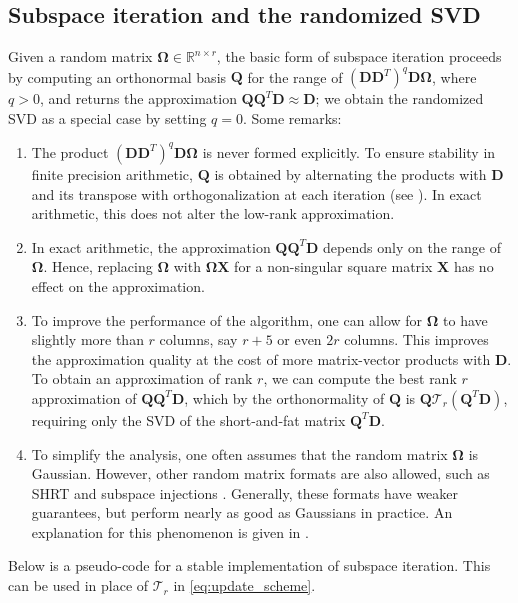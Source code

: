 \documentclass[11pt]{article}
\begin{document}
\subsection{Subspace iteration and the randomized SVD}\label{section:subspaceiteration}
Given a random matrix $\bm{\Omega} \in \mathbb{R}^{n \times r}$, the basic form of subspace iteration proceeds by computing an orthonormal basis $\bm{Q}$ for the range of $(\bm{D}\bm{D}^T)^q \bm{D} \bm{\Omega}$, where $q > 0$, and returns the approximation $\bm{Q} \bm{Q}^T \bm{D} \approx \bm{D}$; we obtain the randomized SVD as a special case by setting $q = 0$. Some remarks:
\begin{enumerate}
    \item[i)] The product $(\bm{D}\bm{D}^T)^q \bm{D} \bm{\Omega}$ is never formed explicitly. To ensure stability in finite precision arithmetic, $\bm{Q}$ is obtained by alternating the products with $\bm{D}$ and its transpose with orthogonalization at each iteration (see ). In exact arithmetic, this does not alter the low-rank approximation.
    \item[ii)] In exact arithmetic, the approximation $\bm{Q} \bm{Q}^T \bm{D}$ depends only on the range of $\bm{\Omega}$. Hence, replacing $\bm{\Omega}$ with $\bm{\Omega} \bm{X}$ for a non-singular square matrix $\bm{X}$ has no effect on the approximation. 
    \item[iii)] To improve the performance of the algorithm, one can allow for $\bm{\Omega}$ to have slightly more than $r$ columns, say $r+5$ or even $2r$ columns. This improves the approximation quality at the cost of more matrix-vector products with $\bm{D}$. To obtain an approximation of rank $r$, we can compute the best rank $r$ approximation of $\bm{Q} \bm{Q}^T \bm{D}$, which by the orthonormality of $\bm{Q}$ is $\bm{Q} \mathcal{T}_r(\bm{Q}^T \bm{D})$, requiring only the SVD of the short-and-fat matrix $\bm{Q}^T \bm{D}$. 
    \item[iv)] To simplify the analysis, one often assumes that the random matrix $\bm{\Omega}$ is Gaussian. However, other random matrix formats are also allowed, such as SHRT and subspace injections \cite{camano2025faster}. Generally, these formats have weaker guarantees, but perform nearly as good as Gaussians in practice. An explanation for this phenomenon is given in \cite{camano2025faster}.
\end{enumerate}
Below is a pseudo-code for a stable implementation of subspace iteration. This can be used in place of $\mathcal{T}_r$ in \eqref{eq:update_scheme}.
\end{document}
